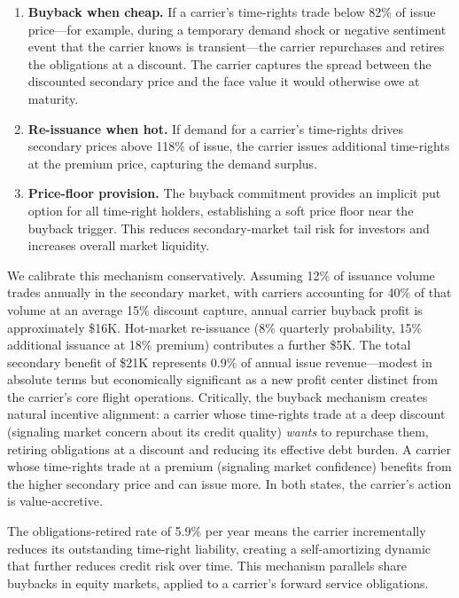 \documentclass[12pt,a4paper]{article}
\begin{document}
\begin{enumerate}[label=(\roman*)]
    \item \textbf{Buyback when cheap.} If a carrier's time-rights trade below 82\% of issue price---for example, during a temporary demand shock or negative sentiment event that the carrier knows is transient---the carrier repurchases and retires the obligations at a discount. The carrier captures the spread between the discounted secondary price and the face value it would otherwise owe at maturity.
    \item \textbf{Re-issuance when hot.} If demand for a carrier's time-rights drives secondary prices above 118\% of issue, the carrier issues additional time-rights at the premium price, capturing the demand surplus.
    \item \textbf{Price-floor provision.} The buyback commitment provides an implicit put option for all time-right holders, establishing a soft price floor near the buyback trigger. This reduces secondary-market tail risk for investors and increases overall market liquidity.
\end{enumerate}

We calibrate this mechanism conservatively. Assuming 12\% of issuance volume trades annually in the secondary market, with carriers accounting for 40\% of that volume at an average 15\% discount capture, annual carrier buyback profit is approximately \$16K. Hot-market re-issuance (8\% quarterly probability, 15\% additional issuance at 18\% premium) contributes a further \$5K. The total secondary benefit of \$21K represents 0.9\% of annual issue revenue---modest in absolute terms but economically significant as a new profit center distinct from the carrier's core flight operations. Critically, the buyback mechanism creates natural incentive alignment: a carrier whose time-rights trade at a deep discount (signaling market concern about its credit quality) \textit{wants} to repurchase them, retiring obligations at a discount and reducing its effective debt burden. A carrier whose time-rights trade at a premium (signaling market confidence) benefits from the higher secondary price and can issue more. In both states, the carrier's action is value-accretive.

The obligations-retired rate of 5.9\% per year means the carrier incrementally reduces its outstanding time-right liability, creating a self-amortizing dynamic that further reduces credit risk over time. This mechanism parallels share buybacks in equity markets, applied to a carrier's forward service obligations.
\end{document}
